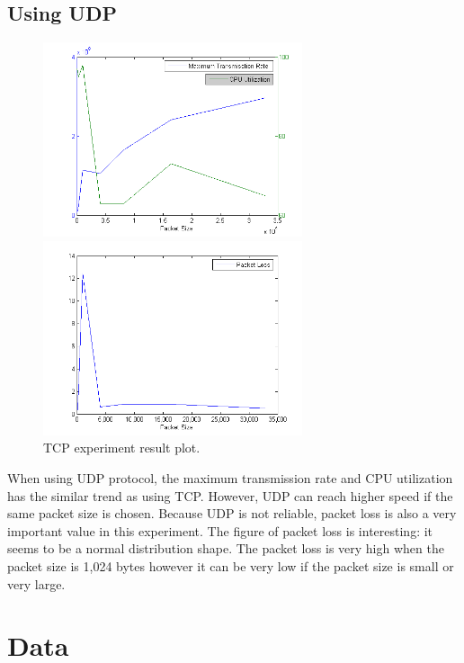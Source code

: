 \documentclass[11pt]{article}
\begin{document}
\subsection{Using UDP}
\begin{figure}
\begin{minipage}[c]{0.5\textwidth} 
\centering 
\includegraphics[width=3in]{UDP1.png} 
\end{minipage}%
\begin{minipage}[c]{0.5\textwidth} 
\centering 
\includegraphics[width=3in]{UDP2.png}
\end{minipage}%
\caption{TCP experiment result plot.}
\label{fig:TCP}
\end{figure}
When using UDP protocol, the maximum transmission rate and CPU utilization has the similar trend as using TCP. However, UDP can reach higher speed if the same packet size is chosen. Because UDP is not reliable, packet loss is also a very important value in this experiment. The figure of packet loss is interesting: it seems to be a normal distribution shape. The packet loss is very high when the packet size is 1,024 bytes however it can be very low if the packet size is small or very large.

\appendix
\section{Data}
\end{document}
